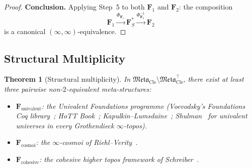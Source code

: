 \documentclass[11pt]{article}
\theoremstyle{plain}
\newtheorem{theorem}{Theorem}[section]
\theoremstyle{definition}
\newcommand{\Meta}{\mathfrak{Meta}}
\begin{document}
\begin{proof}
\textbf{Conclusion.} Applying Step~5 to both $\mathbf{F}_1$ and $\mathbf{F}_2$: the composition
\[ \mathbf{F}_1 \xrightarrow{\Phi_{\mathbf{F}_1}} \mathbf{F}_S^* \xrightarrow{\Phi_{\mathbf{F}_2}^{-1}} \mathbf{F}_2 \]
is a canonical $(\infty, \infty)$-equivalence.
\end{proof}

\subsection{Structural Multiplicity}

\begin{theorem}[Structural multiplicity]\label{thm:meta-mult}
In $\Meta_{\mathrm{Cls}} \setminus \Meta_{\mathrm{Cls}}^{\top}$, there exist at least three pairwise non-$2$-equivalent meta-structures:
\begin{itemize}
\item $\mathbf{F}_{\mathrm{univalent}}$: the Univalent Foundations programme (Voevodsky's \emph{Foundations} Coq library~\cite{VoevodskyFoundations2010}; HoTT Book~\cite{HoTTBook2013}; Kapulkin--Lumsdaine~\cite{KapulkinLumsdaine2021}; Shulman~\cite{Shulman2019} for univalent universes in every Grothendieck $\infty$-topos).
\item $\mathbf{F}_{\mathrm{cosmoi}}$: the $\infty$-cosmoi of Riehl--Verity~\cite{RiehlVerity2022}.
\item $\mathbf{F}_{\mathrm{cohesive}}$: the cohesive higher topos framework of Schreiber~\cite{Schreiber2013}.
\end{itemize}
\end{theorem}
\end{document}
